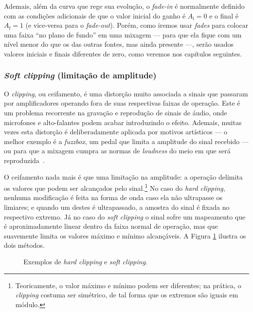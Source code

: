 Ademais, além da curva que rege sua evolução, o \textit{fade-in} é normalmente definido com as condições adicionais de que o valor inicial do ganho é $A_\text{i} = 0$ e o final é $A_\text{f} = 1$ (e vice-versa para o \textit{fade-out}). Porém, como iremos usar \textit{fades} para colocar uma faixa ``no plano de fundo'' em uma mixagem --- para que ela fique com um nível menor do que os das outras fontes, mas ainda presente ---, serão usados valores iniciais e finais diferentes de zero, como veremos nos capítulos seguintes.

\subsubsection{\textit{Soft clipping} (limitação de amplitude)}

O \textit{clipping}, ou ceifamento, é uma distorção muito associada a sinais que passaram por amplificadores operando fora de suas respectivas faixas de operação. Este é um problema recorrente na gravação e reprodução de sinais de áudio, onde microfones e alto-falantes podem acabar introduzindo o efeito. Ademais, muitas vezes esta distorção é deliberadamente aplicada por motivos artísticos --- o melhor exemplo é a \textit{fuzzbox}, um pedal que limita a amplitude do sinal recebido --- ou para que a mixagem cumpra as normas de \textit{loudness} do meio em que será reproduzida~\cite{loudness-standards}.

O ceifamento nada mais é que uma limitação na amplitude: a operação delimita os valores que podem ser alcançados pelo sinal.\footnote{Teoricamente, o valor máximo e mínimo podem ser diferentes; na prática, o \textit{clipping} costuma ser simétrico, de tal forma que os extremos são iguais em módulo.} No caso do \textit{hard clipping}, nenhuma modificação é feita na forma de onda caso ela não ultrapasse os limiares; e quando um destes é ultrapassado, a amostra do sinal é fixada no respectivo extremo. Já no caso do \textit{soft clipping} o sinal sofre um mapeamento que é aproximadamente linear dentro da faixa normal de operação, mas que suavemente limita os valores máximo e mínimo alcançáveis. A Figura \ref{fig:intro:clipping} ilustra os dois métodos.
\begin{figure}[!ht]
    \centering
    
    \caption[Exemplos de \textit{hard clipping} e \textit{soft clipping}]{Exemplos de \textit{hard clipping} e \textit{soft clipping}.}
    \label{fig:intro:clipping}
\end{figure}

